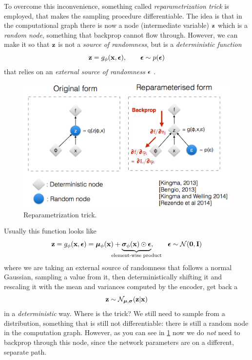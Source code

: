 To overcome this inconvenience, something called \emph{reparametrization trick} is employed, that makes the sampling procedure differentiable. The idea is that in the computational graph there is now a node (intermediate variable) $\vb{z}$ which is a \emph{random node}, something that backprop cannot flow through. However, we can make it so that $\vb{z}$ is not a \emph{source of randomness}, but is a \emph{deterministic function}
\begin{equation}
    \vb{z} = g_{\phi}(\vb{x}, \vb*{\epsilon}), \qquad \vb*{\epsilon} \sim p(\vb*{\epsilon})
\end{equation} 
that relies on an \emph{external source of randomness} $\vb*{\epsilon}$ . 

\begin{figure}[H]
    \centering
    \includegraphics[width=.7\textwidth]{figures/11/rsample.png}
    \caption{Reparametrization trick.}
    \label{fig:11:3:rsample}
\end{figure}

Usually this function looks like
\begin{equation}
    \vb{z} = g_{\phi}(\vb{x}, \vb*{\epsilon}) = \vb*{\mu}_{\phi}(\vb{x}) + \underbrace{\vb*{\sigma}_{\phi} (\vb{x}) \odot \vb*{\epsilon}}_{\mathclap{\text{element-wise product}}}, \qquad \vb*{\epsilon} \sim \mathcal{N}(\vb{0}, \vb{I})
\end{equation}
where we are taking an external source of randomness that follows a normal Gaussian, sampling a value from it, then deterministically shifting it and rescaling it with the mean and variances computed by the encoder, get back a 
$$\vb{z} \sim \mathcal{N}_{\vb*{\mu}, \vb*{\sigma}}(\vb{z} | \vb{x})$$ 
in a \emph{deterministic} way. Where is the trick? We still need to sample from a distribution, something that is still not differentiable: there is still a random node in the computation graph. However, as you can see in \cref{fig:11:3:rsample} now we do \emph{not} need to backprop through this node, since the network parameters are on a different, separate path.

